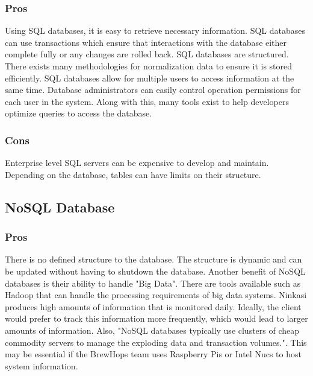 \documentclass[draftclsnofoot,onecolumn,letterpaper,10pt,compsoc]{IEEEtran}
\begin{document}
        \subsubsection{Pros}
            Using SQL databases, it is easy to retrieve necessary information.
            SQL databases can use transactions which ensure that interactions with the database either complete fully or any changes are rolled back.
            SQL databases are structured.
            There exists many methodologies for normalization data to ensure it is stored efficiently\cite{TechwallaSQL}.
            SQL databases allow for multiple users to access information at the same time\cite{TechwallaSQLPros}.
            Database administrators can easily control operation permissions for each user in the system.
            Along with this, many tools exist to help developers optimize queries to access the database.
    
        \subsubsection{Cons}
            Enterprise level SQL servers can be expensive to develop and maintain.
            Depending on the database, tables can have limits on their structure\cite{TechwallaSQLCons}.

        
	\subsection{NoSQL Database}
        \subsubsection{Pros}
            There is no defined structure to the database.
            The structure is dynamic and can be updated without having to shutdown the database\cite{MongoDBProsCons}.
            Another benefit of NoSQL databases is their ability to handle "Big Data".
            There are tools available such as Hadoop that can handle the processing requirements of big data systems\cite{NoSQLProsCons}.
            Ninkasi produces high amounts of information that is monitored daily.
            Ideally, the client would prefer to track this information more frequently, which would lead to larger amounts of information.
            Also, "NoSQL databases typically use clusters of cheap commodity servers to manage the exploding data and transaction volumes."\cite{NoSQLProsCons}.
            This may be essential if the BrewHops team uses Raspberry Pis or Intel Nucs to host system information.
            
\end{document}

